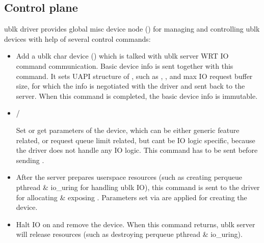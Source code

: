 \documentclass[a4paper,11pt,english]{sphinxmanual}
\begin{document}
\subsection{Control plane}
\label{\detokenize{ublk:control-plane}}
ublk driver provides global misc device node () for
managing and controlling ublk devices with help of several control commands:
\begin{itemize}
\item {} 

Add a ublk char device () which is talked with ublk server
WRT IO command communication. Basic device info is sent together with this
command. It sets UAPI structure of ,
such as , , and max IO request buffer size,
for which the info is negotiated with the driver and sent back to the server.
When this command is completed, the basic device info is immutable.

\item {} 
 / 

Set or get parameters of the device, which can be either generic feature
related, or request queue limit related, but can\textquotesingle{}t be IO logic specific,
because the driver does not handle any IO logic. This command has to be
sent before sending .

\item {} 

After the server prepares userspace resources (such as creating per\sphinxhyphen{}queue
pthread \& io\_uring for handling ublk IO), this command is sent to the
driver for allocating \& exposing . Parameters set via
 are applied for creating the device.

\item {} 

Halt IO on  and remove the device. When this command returns,
ublk server will release resources (such as destroying per\sphinxhyphen{}queue pthread \&
io\_uring).


\end{itemize}
\end{document}
